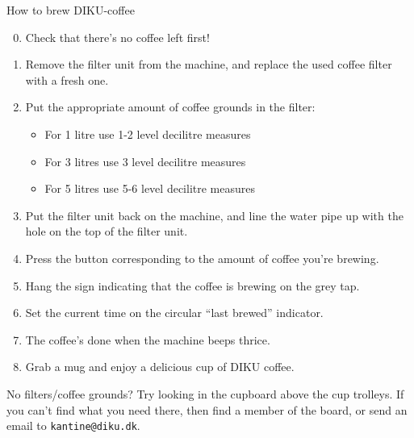 \documentclass{article}
\begin{document}

\maketitle

\null
\vspace{-0.2cm}

\fontsize{18}{20}\selectfont

\hspace{-0.7cm}\noindent How to brew DIKU-coffee

\begin{enumerate}

\setcounter{enumi}{-1}

\itemsep-0.1cm

\item Check that there's no coffee left first!

\item Remove the filter unit from the machine, and replace the used coffee
filter with a fresh one.

\item Put the appropriate amount of coffee grounds in the filter:

\begin{itemize}

\bfseries

\item For 1 litre use 1-2 level decilitre measures

\item For 3 litres use 3 level decilitre measures

\item For 5 litres use 5-6 level decilitre measures

\end{itemize}

\item Put the filter unit back on the machine, and line the water pipe up with
the hole on the top of the filter unit.

\item Press the button corresponding to the amount of coffee you're brewing.

\item Hang the sign indicating that the coffee is brewing on the grey tap.

\item Set the current time on the circular ``last brewed'' indicator.

\item The coffee's done when the machine beeps thrice.

\item Grab a mug and enjoy a delicious cup of DIKU coffee.

\end{enumerate}

\vspace{0.2cm}

\begin{center}
\LARGE

No filters/coffee grounds? Try looking in the cupboard above the cup trolleys.
If you can't find what you need there, then find a member of the board, or send
an email to \texttt{kantine@diku.dk}.

\end{center}

\underskriv
\end{document}
